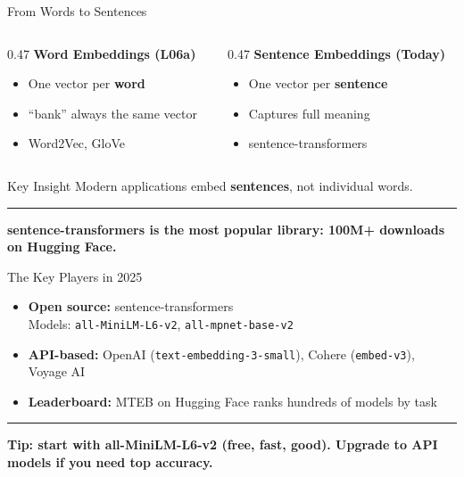 \documentclass[8pt,aspectratio=169]{beamer}
\newcommand{\bottomnote}[1]{%
\vfill
\vspace{-2mm}
\textcolor{mllavender2}{\rule{\textwidth}{0.4pt}}
\vspace{1mm}
\footnotesize
\textbf{#1}
}
\newcommand{\highlight}[1]{\textcolor{mlorange}{\textbf{#1}}}
\newenvironment{compactlist}{%
  \begin{itemize}%
    \setlength{\itemsep}{2pt}%
    \setlength{\parskip}{0pt}%
    \setlength{\parsep}{0pt}%
}{%
  \end{itemize}%
}
\begin{document}
\begin{frame}{From Words to Sentences}
\begin{columns}[T]
\begin{column}{0.47\textwidth}
\textcolor{mlred}{\textbf{Word Embeddings (L06a)}}
\begin{compactlist}
\item One vector per \textbf{word}
\item ``bank'' always the same vector
\item Word2Vec, GloVe
\end{compactlist}
\end{column}
\begin{column}{0.47\textwidth}
\textcolor{mlgreen}{\textbf{Sentence Embeddings (Today)}}
\begin{compactlist}
\item One vector per \textbf{sentence}
\item Captures full meaning
\item sentence-transformers
\end{compactlist}
\end{column}
\end{columns}
\vspace{4mm}
\begin{block}{Key Insight}
Modern applications embed \highlight{sentences}, not individual words.
\end{block}
\bottomnote{sentence-transformers is the most popular library: 100M+ downloads on Hugging Face.}
\end{frame}

\begin{frame}{The Key Players in 2025}
\begin{compactlist}
\item \textbf{Open source:} sentence-transformers\\
      Models: \texttt{all-MiniLM-L6-v2}, \texttt{all-mpnet-base-v2}
\item \textbf{API-based:} OpenAI (\texttt{text-embedding-3-small}), Cohere (\texttt{embed-v3}), Voyage AI
\item \textbf{Leaderboard:} MTEB on Hugging Face ranks hundreds of models by task
\end{compactlist}
\bottomnote{Tip: start with all-MiniLM-L6-v2 (free, fast, good). Upgrade to API models if you need top accuracy.}
\end{frame}
\end{document}
